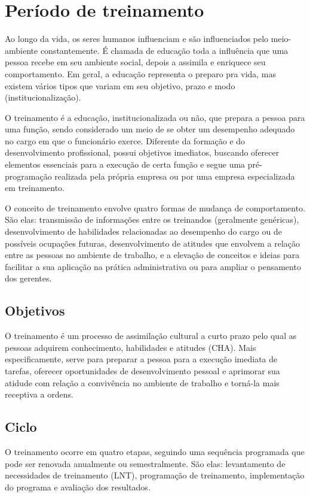 
\chapter{Período de treinamento}
Ao longo da vida, os seres humanos influenciam e são influenciados pelo meio-ambiente constantemente. É chamada de educação toda a influência que uma pessoa recebe em seu ambiente social, depois a assimila e enriquece seu comportamento. Em geral, a educação representa o preparo pra vida, mas existem vários tipos que variam em seu objetivo, prazo e modo (institucionalização). 

O treinamento é a educação, institucionalizada ou não, que prepara a pessoa para uma função, sendo considerado um meio de se obter um desempenho adequado no cargo em que o funcionário exerce. Diferente da formação e do desenvolvimento profissional, possui objetivos imediatos, buscando oferecer elementos essenciais para a execução de certa função e segue uma pré-programação realizada pela própria empresa ou por uma empresa especializada em treinamento.

O conceito de treinamento envolve quatro formas de mudança de comportamento. São elas: transmissão de informações entre os treinandos (geralmente genéricas), desenvolvimento de habilidades relacionadas ao desempenho do cargo ou de possíveis ocupações futuras, desenvolvimento de atitudes que envolvem a relação entre as pessoas no ambiente de trabalho, e a elevação de conceitos e ideias para facilitar a sua aplicação na prática administrativa ou para ampliar o pensamento dos gerentes.

\section{Objetivos}
O treinamento é um processo de assimilação cultural a curto prazo pelo qual as pessoas adquirem conhecimento, habilidades e atitudes (CHA). Mais especificamente, serve para preparar a pessoa para a execução imediata de tarefas, oferecer oportunidades de desenvolvimento pessoal e aprimorar sua atidude com relação a convivência no ambiente de trabalho e torná-la mais receptiva a ordens.

\section{Ciclo}
O treinamento ocorre em quatro etapas, seguindo uma sequência programada que pode ser renovada anualmente ou semestralmente. São elas: levantamento de necessidades de treinamento (LNT), programação de treinamento, implementação do programa e avaliação dos resultados.

